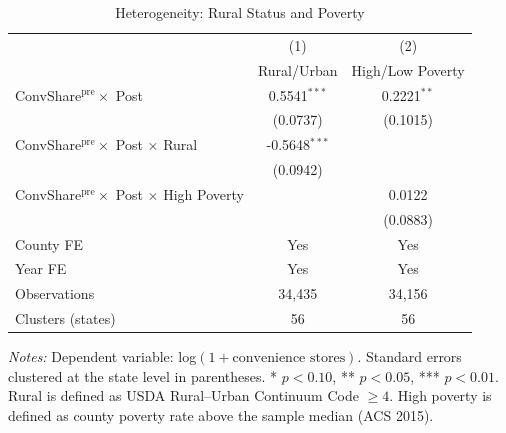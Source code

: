 
\begin{table}[H]
\centering
\caption{Heterogeneity: Rural Status and Poverty}
\label{tab:hetero}
\begin{threeparttable}
\begin{tabular}{lcc}
\toprule
& (1) & (2) \\
& Rural/Urban & High/Low Poverty \\
\midrule
ConvShare$^{\text{pre}} \times$ Post & 0.5541$^{***}$ & 0.2221$^{**}$ \\
& (0.0737) & (0.1015) \\[4pt]
ConvShare$^{\text{pre}} \times$ Post $\times$ Rural & -0.5648$^{***}$ & \\
& (0.0942) & \\[4pt]
ConvShare$^{\text{pre}} \times$ Post $\times$ High Poverty & & 0.0122 \\
& & (0.0883) \\[4pt]
County FE & Yes & Yes \\
Year FE & Yes & Yes \\
Observations & 34,435 & 34,156 \\
Clusters (states) & 56 & 56 \\
\bottomrule
\end{tabular}
\begin{tablenotes}[flushleft]
\small
\item \textit{Notes:} Dependent variable: log$(1 + \text{convenience stores})$. Standard errors clustered at the state level in parentheses. * $p<0.10$, ** $p<0.05$, *** $p<0.01$. Rural is defined as USDA Rural--Urban Continuum Code $\geq 4$. High poverty is defined as county poverty rate above the sample median (ACS 2015).
\end{tablenotes}
\end{threeparttable}
\end{table}

